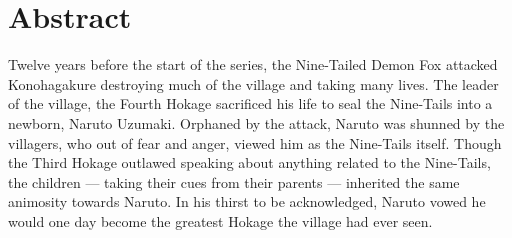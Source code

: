 \section*{Abstract}
Twelve years before the start of the series, the Nine-Tailed Demon Fox attacked Konohagakure destroying much of the village and taking many lives. The leader of the village, the Fourth Hokage sacrificed his life to seal the Nine-Tails into a newborn, Naruto Uzumaki. Orphaned by the attack, Naruto was shunned by the villagers, who out of fear and anger, viewed him as the Nine-Tails itself. Though the Third Hokage outlawed speaking about anything related to the Nine-Tails, the children — taking their cues from their parents — inherited the same animosity towards Naruto. In his thirst to be acknowledged, Naruto vowed he would one day become the greatest Hokage the village had ever seen.
